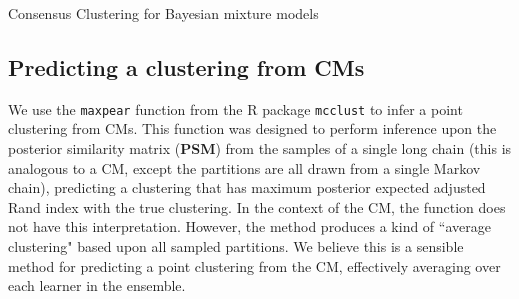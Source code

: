 \documentclass{bioinfo}
\begin{document}
\begin{methods}
\begin{algorithm} \label{algorithm:CCforBayesianMixtures}
	\caption{Consensus Clustering for Bayesian mixture models}
\end{algorithm}




\subsection{Predicting a clustering from CMs}
We use the \texttt{maxpear} function \citep{fritsch2009improved} from the R package \texttt{mcclust} \citep{fritsch2012mcclust} to infer a point clustering from CMs. This function was designed to perform inference upon the posterior similarity matrix (\textbf{PSM}) from the samples of a single long chain (this is analogous to a CM, except the partitions are all drawn from a single Markov chain), predicting a clustering that has maximum posterior expected adjusted Rand index \citep[\textbf{ARI},][]{hubert1985comparing} with the true clustering. In the context of the CM, the function does not have this interpretation. However, the method produces a kind of ``average clustering" based upon all sampled partitions. We believe this is a sensible method for predicting a point clustering from the CM, effectively averaging over each learner in the ensemble.


\end{methods}
\end{document}
